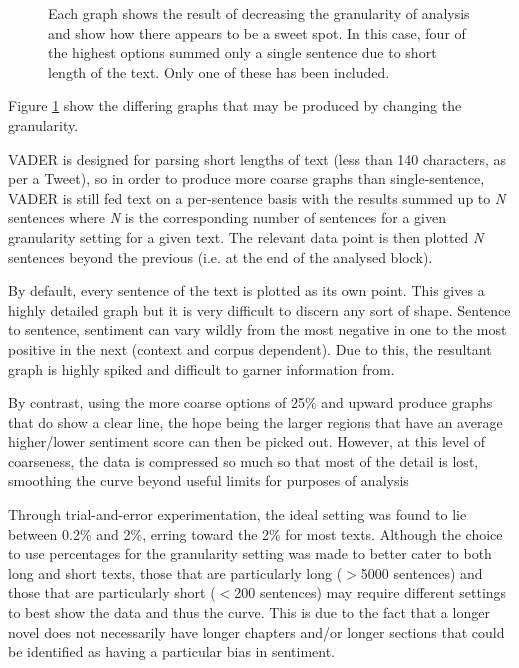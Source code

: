 \documentclass{article}
\begin{document}
{\begin{figure}
            \centering
            \caption{Each graph shows the result of decreasing the granularity of analysis and show how there appears to be a sweet spot. In this case, four of the highest options summed only a single sentence due to short length of the text. Only one of these has been included.}
            \label{fig:cinderellaGran}
        \end{figure}
        Figure \ref{fig:cinderellaGran} show the differing graphs that may be produced by changing the granularity.

        VADER is designed for parsing short lengths of text (less than 140 characters, as per a Tweet), so in order to produce more coarse graphs than single-sentence, VADER is still fed text on a per-sentence basis with the results summed up to \textit{N} sentences where \textit{N} is the corresponding number of sentences for a given granularity setting for a given text. The relevant data point is then plotted \textit{N} sentences beyond the previous (i.e. at the end of the analysed block).

        By default, every sentence of the text is plotted as its own point. This gives a highly detailed graph but it is very difficult to discern any sort of shape. Sentence to sentence, sentiment can vary wildly from the most negative in one to the most positive in the next (context and corpus dependent). Due to this, the resultant graph is highly spiked and difficult to garner information from.

        By contrast, using the more coarse options of 25\% and upward produce graphs that do show a clear line, the hope being the larger regions that have an average higher/lower sentiment score can then be picked out. However, at this level of coarseness, the data is compressed so much so that most of the detail is lost, smoothing the curve beyond useful limits for purposes of analysis

        Through trial-and-error experimentation, the ideal setting was found to lie between 0.2\% and 2\%, erring toward the 2\% for most texts. Although the choice to use percentages for the granularity setting was made to better cater to both long and short texts, those that are particularly long ($>$5000 sentences) and those that are particularly short ($<$200 sentences) may require different settings to best show the data and thus the curve. This is due to the fact that a longer novel does not necessarily have longer chapters and/or longer sections that could be identified as having a particular bias in sentiment.
        
}
\end{document}
